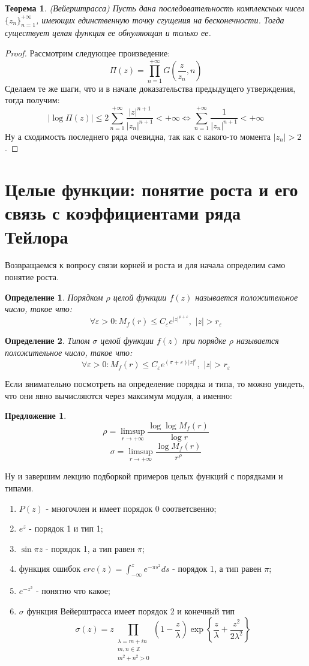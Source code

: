 \documentclass[12pt,a4paper]{article} %
\newtheorem{theorem}{Теорема}
\newtheorem{definition}{Определение}
\newtheorem{proposition}{Предложение}
\begin{document}
	\begin{theorem}
		(Вейерштрасса) Пусть дана последовательность комплексных чисел $\{z_n\}_{n=1}^{+\infty}$, имеющих единственную точку сгущения на бесконечности. Тогда существует целая функция ее обнуляющая и только ее.
	\end{theorem}
	\begin{proof}
		Рассмотрим следующее произведение:
		$$\Pi(z)=\prod_{n=1}^{+\infty}G\left(\frac{z}{z_n},n\right)$$
		Сделаем те же шаги, что и в начале доказательства предыдущего утверждения, тогда получим:
		$$|\log\Pi(z)|\leq2\sum_{n=1}^{+\infty}\frac{|z|^{n+1}}{|z_n|^{n+1}}<+\infty\Leftrightarrow\sum_{n=1}^{+\infty}\frac{1}{|z_n|^{n+1}}<+\infty$$
		Ну а сходимость последнего ряда очевидна, так как с какого-то момента $|z_n|>2$.
	\end{proof}
	\section{Целые функции: понятие роста и его связь с коэффициентами ряда Тейлора}
	Возвращаемся к вопросу связи корней и роста и для начала определим само понятие роста.
	\begin{definition}
		Порядком $\rho$ целой функции $f(z)$ называется положительное число, такое что:
		$$\forall \varepsilon>0:M_f(r)\leq C_{\varepsilon}e^{|z|^{\rho+\varepsilon}},\,\,|z|>r_{\varepsilon}$$
	\end{definition}
	\begin{definition}
		Типом $\sigma$ целой функции $f(z)$ при порядке $\rho$ называется положительное число, такое что:
		$$\forall \varepsilon>0:M_f(r)\leq C_{\varepsilon}e^{(\sigma+\varepsilon)|z|^{\rho}},\,\,|z|>r_{\varepsilon}$$
	\end{definition}
	Если внимательно посмотреть на определение порядка и типа, то можно увидеть, что они явно вычисляются через максимум модуля, а именно:
	\begin{proposition}
		$$\rho=\limsup\limits_{r\rightarrow+\infty}\frac{\log\log M_f(r)}{\log r}$$
		$$\sigma=\limsup\limits_{r\rightarrow+\infty}\frac{\log M_f(r)}{r^{\rho}}$$
	\end{proposition}
	Ну и завершим лекцию подборкой примеров целых функций с порядками и типами.
	\begin{enumerate}
		\item $P(z)$ - многочлен и имеет порядок 0 соответсвенно;
		\item $e^z$ - порядок 1 и тип 1;
		\item $\sin\pi z$ - порядок 1, а тип равен $\pi$;
		\item функция ошибок $erc(z)=\displaystyle\int_{-\infty}^ze^{-\pi s^2}ds$ - порядок 1, а тип равен $\pi$;
		\item $e^{-z^2}$ - понятно что какое;
		\item $\sigma$ функция Вейерштрасса имеет порядок 2 и конечный тип
		$$\sigma(z)=z\prod_{\substack{\lambda=m+in \\ m,n\in\mathbb{Z} \\ m^2+n^2>0}}\left(1-\frac{z}{\lambda}\right)\exp\left\{\frac{z}{\lambda}+\frac{z^2}{2\lambda^2}\right\}$$
	\end{enumerate}
\end{document}
